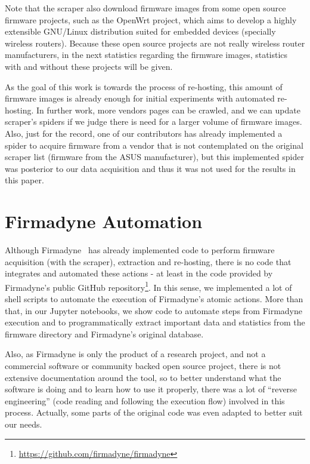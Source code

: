 Note that the scraper also download firmware images from some open source firmware projects, such as the OpenWrt project, which aims to develop a highly extensible GNU/Linux distribution suited for embedded devices (specially wireless routers). Because these open source projects are not really wireless router manufacturers, in the next statistics regarding the firmware images, statistics with and without these projects will be given.

As the goal of this work is towards the process of re-hosting, this amount of firmware images is already enough for initial experiments with automated re-hosting. In further work, more vendors pages can be crawled, and we can update scraper's spiders if we judge there is need for a larger volume of firmware images. Also, just for the record, one of our contributors has already implemented a spider to acquire firmware from a vendor that is not contemplated on the original scraper list (firmware from the ASUS manufacturer), but this implemented spider was posterior to our data acquisition and thus it was not used for the results in this paper.

\section{Firmadyne Automation}

Although Firmadyne~\cite{firmadyne} has already implemented code to perform firmware acquisition (with the scraper), extraction and re-hosting, there is no code that integrates and automated these actions - at least in the code provided by Firmadyne's public GitHub repository\footnote{\url{https://github.com/firmadyne/firmadyne}}. In this sense, we implemented a lot of shell scripts to automate the execution of Firmadyne's atomic actions. More than that, in our Jupyter notebooks, we show code to automate steps from Firmadyne execution and to programmatically extract important data and statistics from the firmware directory and Firmadyne's original database.

Also, as Firmadyne is only the product of a research project, and not a commercial software or community backed open source project, there is not extensive documentation around the tool, so to better understand what the software is doing and to learn how to use it properly, there was a lot of ``reverse engineering'' (code reading and following the execution flow) involved in this process. Actually, some parts of the original code was even adapted to better suit our needs.

